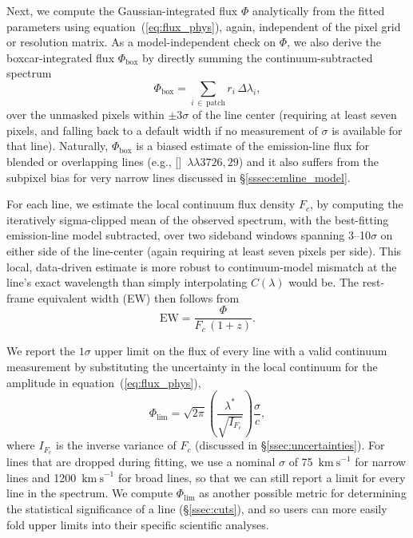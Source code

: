 \documentclass[modern,linenumbers]{aastex701}
\newcommand{\kms}{\ensuremath{\mathrm{km~s}^{-1}}}
\newcommand{\oiidoublet}{[\ion{O}{2}]~$\lambda\lambda3726,29$}
\begin{document}
Next, we compute the Gaussian-integrated flux $\Phi$ analytically from
the fitted parameters using equation~(\ref{eq:flux_phys}), again,
independent of the pixel grid or resolution matrix. As a
model-independent check on $\Phi$, we also derive the
boxcar-integrated flux $\Phi_\mathrm{box}$ by directly summing the
continuum-subtracted spectrum
\begin{equation}
  \Phi_\mathrm{box} = \sum_{i\,\in\,\mathrm{patch}} r_i\,\Delta\lambda_i,
  \label{eq:boxflux}
\end{equation}
over the unmasked pixels within $\pm3\sigma$ of the line center
(requiring at least seven pixels, and falling back to a default width
if no measurement of $\sigma$ is available for that line). Naturally,
$\Phi_\mathrm{box}$ is a biased estimate of the emission-line flux for
blended or overlapping lines (e.g., \oiidoublet) and it also suffers
from the subpixel bias for very narrow lines discussed in
\S\ref{sssec:emline_model}.


For each line, we estimate the local continuum flux density $F_c$, by
computing the iteratively sigma-clipped mean of the observed spectrum,
with the best-fitting emission-line model subtracted, over two
sideband windows spanning 3--10$\sigma$ on either side of the
line-center (again requiring at least seven pixels per side). This
local, data-driven estimate is more robust to continuum-model mismatch
at the line's exact wavelength than simply interpolating $C(\lambda)$
would be. The rest-frame equivalent width (EW) then follows from
\begin{equation}
  \mathrm{EW} = \frac{\Phi}{F_c\,(1+z)}.
  \label{eq:ew}
\end{equation}

We report the $1\sigma$ upper limit on the flux of every line with a
valid continuum measurement by substituting the uncertainty in the
local continuum for the amplitude in equation~(\ref{eq:flux_phys}),
\begin{equation}
  \Phi_\mathrm{lim} = \sqrt{2\pi} \left(
  \frac{\lambda^*}{\sqrt{I_{F_c}}} \right) \frac{\sigma}{c},
  \label{eq:fluxlimit}
\end{equation}
where $I_{F_c}$ is the inverse variance of $F_c$ (discussed in
\S\ref{ssec:uncertainties}). For lines that are dropped during
fitting, we use a nominal $\sigma$ of 75~\kms{} for narrow lines and
1200~\kms{} for broad lines, so that we can still report a limit for
every line in the spectrum. We compute $\Phi_\mathrm{lim}$ as another
possible metric for determining the statistical significance of a line
(\S\ref{ssec:cuts}), and so users can more easily fold upper limits
into their specific scientific analyses.
\end{document}
